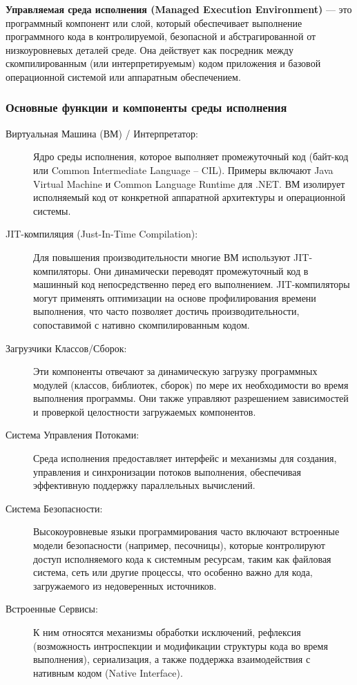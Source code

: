 \textbf{ Управляемая среда исполнения (Managed Execution Environment)} — это программный компонент или слой, который обеспечивает выполнение программного кода в контролируемой,
безопасной и абстрагированной от низкоуровневых деталей среде. Она действует как посредник между скомпилированным (или интерпретируемым) кодом приложения и базовой операционной
системой или аппаратным обеспечением.

\subsubsection{Основные функции и компоненты среды исполнения}

\begin{description}

    \item[Виртуальная Машина (ВМ) / Интерпретатор:]
    Ядро среды исполнения, которое выполняет промежуточный код (байт-код или Common Intermediate Language – CIL). Примеры включают Java Virtual Machine и Common Language Runtime для .NET. ВМ изолирует исполняемый код от конкретной аппаратной архитектуры и операционной системы.
    \item[JIT-компиляция (Just-In-Time Compilation):]
    Для повышения производительности многие ВМ используют JIT-компиляторы. Они динамически переводят промежуточный код в машинный код непосредственно перед его выполнением. JIT-компиляторы могут применять оптимизации на основе профилирования времени выполнения, что часто позволяет достичь производительности, сопоставимой с нативно скомпилированным кодом.
    \item[Загрузчики Классов/Сборок:]
    Эти компоненты отвечают за динамическую загрузку программных модулей (классов, библиотек, сборок) по мере их необходимости во время выполнения программы. Они также управляют разрешением зависимостей и проверкой целостности загружаемых компонентов.
    \item[Система Управления Потоками:]
    Среда исполнения предоставляет интерфейс и механизмы для создания, управления и синхронизации потоков выполнения, обеспечивая эффективную поддержку параллельных вычислений.
    \item[Система Безопасности:]
    Высокоуровневые языки программирования часто включают встроенные модели безопасности (например, песочницы), которые контролируют доступ исполняемого кода к системным ресурсам, таким как файловая система, сеть или другие процессы, что особенно важно для кода, загружаемого из недоверенных источников.
    \item[Встроенные Сервисы:]
    К ним относятся механизмы обработки исключений, рефлексия (возможность интроспекции и модификации структуры кода во время выполнения), сериализация, а также поддержка взаимодействия с нативным кодом (Native Interface).
\end{description}

